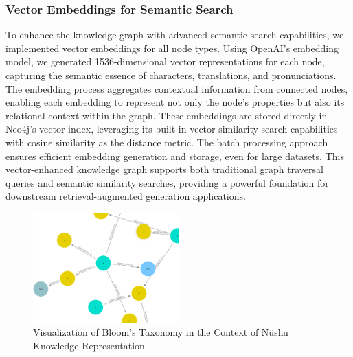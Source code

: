 \documentclass{article}
\begin{document}
\subsubsection{Vector Embeddings for Semantic Search}

To enhance the knowledge graph with advanced semantic search capabilities, we implemented vector embeddings for all node types. Using OpenAI's embedding model, we generated 1536-dimensional vector representations for each node, capturing the semantic essence of characters, translations, and pronunciations. 
The embedding process aggregates contextual information from connected nodes, enabling each embedding to represent not only the node's properties but also its relational context within the graph.
These embeddings are stored directly in Neo4j's vector index, leveraging its built-in vector similarity search capabilities with cosine similarity as the distance metric. The batch processing approach ensures efficient embedding generation and storage, even for large datasets. This vector-enhanced knowledge graph supports both traditional graph traversal queries and semantic similarity searches, providing a powerful foundation for downstream retrieval-augmented generation applications.


    \begin{figure}[htb]
    \centering
    \includegraphics[width=0.5\textwidth]{images/bloom-visualisation.png}
    \caption{Visualization of Bloom's Taxonomy in the Context of N\"{u}shu Knowledge Representation}
    \label{fig:bloom_visualisation}
    \end{figure}
\end{document}
